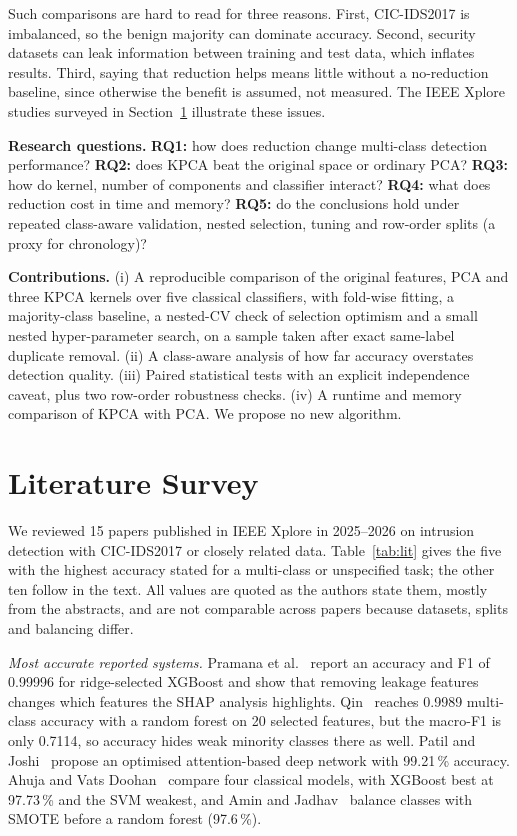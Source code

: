 \documentclass[runningheads]{llncs}
\begin{document}
Such comparisons are hard to read for three reasons. First, CIC-IDS2017 is imbalanced, so the benign majority can dominate accuracy. Second, security datasets can leak information between training and test data, which inflates results. Third, saying that reduction helps means little without a no-reduction baseline, since otherwise the benefit is assumed, not measured. The IEEE Xplore studies surveyed in Section~\ref{sec:lit} illustrate these issues.

\textbf{Research questions.} \textbf{RQ1:} how does reduction change multi-class detection performance? \textbf{RQ2:} does KPCA beat the original space or ordinary PCA? \textbf{RQ3:} how do kernel, number of components and classifier interact? \textbf{RQ4:} what does reduction cost in time and memory? \textbf{RQ5:} do the conclusions hold under repeated class-aware validation, nested selection, tuning and row-order splits (a proxy for chronology)?

\textbf{Contributions.} (i) A reproducible comparison of the original features, PCA and three KPCA kernels over five classical classifiers, with fold-wise fitting, a majority-class baseline, a nested-CV check of selection optimism and a small nested hyper-parameter search, on a sample taken after exact same-label duplicate removal. (ii) A class-aware analysis of how far accuracy overstates detection quality. (iii) Paired statistical tests with an explicit independence caveat, plus two row-order robustness checks. (iv) A runtime and memory comparison of KPCA with PCA. We propose no new algorithm.

\section{Literature Survey}\label{sec:lit}
We reviewed 15 papers published in IEEE Xplore in 2025--2026 on intrusion detection with CIC-IDS2017 or closely related data. Table~\ref{tab:lit} gives the five with the highest accuracy stated for a multi-class or unspecified task; the other ten follow in the text. All values are quoted as the authors state them, mostly from the abstracts, and are not comparable across papers because datasets, splits and balancing differ.





\textit{Most accurate reported systems.} Pramana et al.~\cite{pramana} report an accuracy and F1 of 0.99996 for ridge-selected XGBoost and show that removing leakage features changes which features the SHAP analysis highlights. Qin~\cite{qin} reaches 0.9989 multi-class accuracy with a random forest on 20 selected features, but the macro-F1 is only 0.7114, so accuracy hides weak minority classes there as well. Patil and Joshi~\cite{patilj} propose an optimised attention-based deep network with 99.21\,\% accuracy. Ahuja and Vats Doohan~\cite{ahuja} compare four classical models, with XGBoost best at 97.73\,\% and the SVM weakest, and Amin and Jadhav~\cite{amin} balance classes with SMOTE before a random forest (97.6\,\%).
\end{document}
